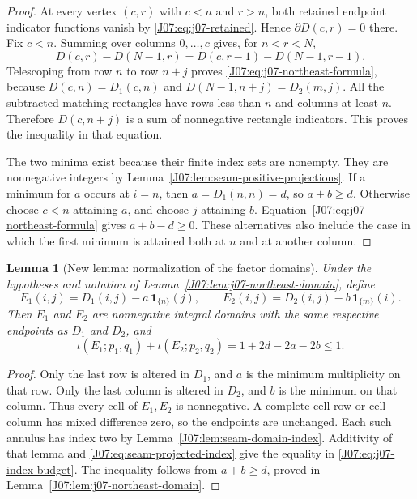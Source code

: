 \documentclass[11pt,oneside]{report}
\newtheorem{lemma}[theorem]{Lemma}
\theoremstyle{definition}
\numberwithin{equation}{section}
\begin{document}
\begin{proof}
At every vertex $(c,r)$ with $c<n$ and $r>n$, both retained endpoint
indicator functions vanish by \eqref{J07:eq:j07-retained}.
Hence $\partial D(c,r)=0$ there.
Fix $c<n$. Summing over columns $0,\ldots,c$ gives, for $n<r<N$,
\[
 D(c,r)-D(N-1,r)=D(c,r-1)-D(N-1,r-1).
\]
Telescoping from row $n$ to row $n+j$ proves
\eqref{J07:eq:j07-northeast-formula}, because
$D(c,n)=D_1(c,n)$ and $D(N-1,n+j)=D_2(m,j)$.
All the subtracted matching rectangles have rows less than $n$ and
columns at least $n$. Therefore $D(c,n+j)$ is a sum of nonnegative
rectangle indicators. This proves the inequality in that equation.

The two minima exist because their finite index sets are nonempty.
They are nonnegative integers by
Lemma~\ref{J07:lem:seam-positive-projections}.
If a minimum for $a$ occurs at $i=n$, then
$a=D_1(n,n)=d$, so $a+b\ge d$.
Otherwise choose $c<n$ attaining $a$, and choose $j$ attaining $b$.
Equation~\eqref{J07:eq:j07-northeast-formula} gives $a+b-d\ge0$.
These alternatives also include the case in which the first minimum
is attained both at $n$ and at another column.
\end{proof}

\begin{lemma}[New lemma: normalization of the factor domains]
\label{J07:lem:j07-annulus-normalization}
Under the hypotheses and notation of
Lemma~\ref{J07:lem:j07-northeast-domain}, define
\[
 E_1(i,j)=D_1(i,j)-a\,\mathbf1_{\{n\}}(j),\qquad
 E_2(i,j)=D_2(i,j)-b\,\mathbf1_{\{m\}}(i).
\]
Then $E_1$ and $E_2$ are nonnegative integral domains with the same
respective endpoints as $D_1$ and $D_2$, and
\begin{equation}\label{J07:eq:j07-index-budget}
 \iota(E_1;p_1,q_1)+\iota(E_2;p_2,q_2)
 =1+2d-2a-2b\le1.
\end{equation}
\end{lemma}

\begin{proof}
Only the last row is altered in $D_1$, and $a$ is the minimum
multiplicity on that row. Only the last column is altered in $D_2$,
and $b$ is the minimum on that column. Thus every cell of $E_1,E_2$
is nonnegative.
A complete cell row or cell column has mixed difference zero,
so the endpoints are unchanged.
Each such annulus has index two by
Lemma~\ref{J07:lem:seam-domain-index}.
Additivity of that lemma and
\eqref{J07:eq:seam-projected-index} give the equality in
\eqref{J07:eq:j07-index-budget}. The inequality follows from $a+b\ge d$,
proved in Lemma~\ref{J07:lem:j07-northeast-domain}.
\end{proof}
\end{document}
